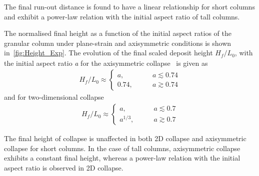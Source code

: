 The final run-out distance is found to have a linear relationship for short 
columns and exhibit a power-law relation with the initial aspect ratio of tall 
columns. 

The normalised final height as a function of the initial aspect ratios of 
the granular column under plane-strain and axisymmetric conditions is 
shown in~\cref{fig:Height_Exp}. The evolution of the final scaled deposit 
height $\textit{H}_{\textit{f}}/\textit{L}_{\textit{0}}$, with the initial 
aspect ratio \textit{a} for the axisymmetric collapse~\citep{Lajeunesse2005} 
is given as 
\begin{align}
\textit{H}_{\textit{f}}/\textit{L}_{\textit{0}} \approx 
\begin{cases}
\textit{a}, \qquad &\textit{a}\lesssim 0.74 \\
0.74, \qquad &\textit{a}\gtrsim 0.74
\end{cases}
\end{align}
and for two-dimensional collapse
\begin{align}
\textit{H}_{\textit{f}}/\textit{L}_{\textit{0}} \approx 
\begin{cases}
\textit{a}, \qquad &\textit{a}\lesssim 0.7 \\
\textit{a}^{1/3}, \qquad &\textit{a}\gtrsim 0.7
\end{cases}
\end{align}

The final height of collapse is unaffected in both 2D collapse and 
axisymmetric collapse for short columns. In the case of tall columns, 
axisymmetric collapse exhibits a constant final height, whereas a power-law 
relation with the initial aspect ratio is observed in 2D collapse.

